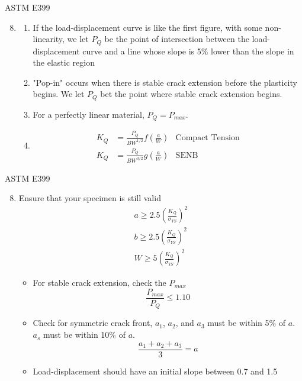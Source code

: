\documentclass[10pt]{beamer}
\begin{document}
\begin{frame}{ASTM E399}
	\begin{enumerate} \setcounter{enumi}{7}
		\item[]
		\begin{enumerate}[<+->]
			\item If the load-displacement curve is like the first figure, with some non-linearity, we let $P_Q$ be the point of intersection between the load-displacement curve and a line whose slope is 5\% lower than the slope in the elastic region
			\item "Pop-in" occurs when there is stable crack extension before the plasticity begins. We let $P_Q$ bet the point where stable crack extension begins.
			\item For a perfectly linear material, $P_Q = P_{max}$.
			\item[]
			\begin{align}
			K_Q &= \frac{P_Q}{BW^{1/2}}f\left(\frac{a}{W}\right) & \text{Compact Tension}\\
			K_Q &= \frac{P_Q}{BW^{3/2}}g\left(\frac{a}{W}\right) & \text{SENB}
			\end{align}
		\end{enumerate}
		
	\end{enumerate}
\end{frame}

\begin{frame}{ASTM E399}
	\begin{enumerate}[<+->]\setcounter{enumi}{7}
		\item Ensure that your specimen is still valid
		\begin{align}
		a \ge 2.5 \left(\frac{K_Q}{\sigma_{YS}}\right)^2\\
		b \ge 2.5 \left(\frac{K_Q}{\sigma_{YS}}\right)^2\\
		W \ge 5 \left(\frac{K_Q}{\sigma_{YS}}\right)^2
		\end{align}
		\begin{itemize}[<+->]
		\item For stable crack extension, check the $P_{max}$
		\begin{equation}
		\frac{P_{max}}{P_Q} \le 1.10
		\end{equation}
		\item Check for symmetric crack front, $a_1$, $a_2$, and $a_3$ must be within 5\% of $a$. $a_s$ must be within 10\% of $a$.
		\begin{equation}
		\frac{a_1 + a_2 + a_3}{3} = a
		\end{equation}
		\item Load-displacement should have an initial slope between 0.7 and 1.5
		\end{itemize}
	\end{enumerate}
\end{frame}
\end{document}
